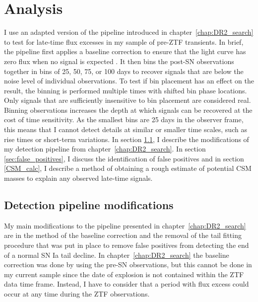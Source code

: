 \documentclass[a4paper,oneside,12pt, class=Latex/Classes/PhDthesisPSnPDF, crop=false]{standalone}
\begin{document}
\section{Analysis}
\label{Pre-ZTF_analysis}
I use an adapted version of the pipeline introduced in chapter~\ref{chap:DR2_search} to test for late-time flux excesses in my sample of pre-ZTF transients. In brief, the pipeline first applies a baseline correction to ensure that the light curve has zero flux when no signal is expected \citep[e.g.][]{Yao_baseline_corr, Miller_baseline_corr}. It then bins the post-SN observations together in bins of 25, 50, 75, or 100 days to recover signals that are below the noise level of individual observations. To test if bin placement has an effect on the result, the binning is performed multiple times with shifted bin phase locations. Only signals that are sufficiently insensitive to bin placement are considered real. Binning observations increases the depth at which signals can be recovered at the cost of time sensitivity. As the smallest bins are 25 days in the observer frame, this means that I cannot detect details at similar or smaller time scales, such as rise times or short-term variations. In section \ref{sec:Pipeline_modifications}, I describe the modifications of my detection pipeline from chapter~\ref{chap:DR2_search}. In section \ref{sec:false_positives}, I discuss the identification of false positives and in section \ref{CSM_calc}, I describe a method of obtaining a rough estimate of potential CSM masses to explain any observed late-time signals.

\subsection{Detection pipeline modifications}
\label{sec:Pipeline_modifications}
My main modifications to the pipeline presented in chapter~\ref{chap:DR2_search} are in the method of the baseline correction and the removal of the tail fitting procedure that was put in place to remove false positives from detecting the end of a normal SN Ia tail decline. In chapter~\ref{chap:DR2_search} the baseline correction was done by using the pre-SN observations, but this cannot be done in my current sample since the date of explosion is not contained within the ZTF data time frame. Instead, I have to consider that a period with flux excess could occur at any time during the ZTF observations.
\end{document}
